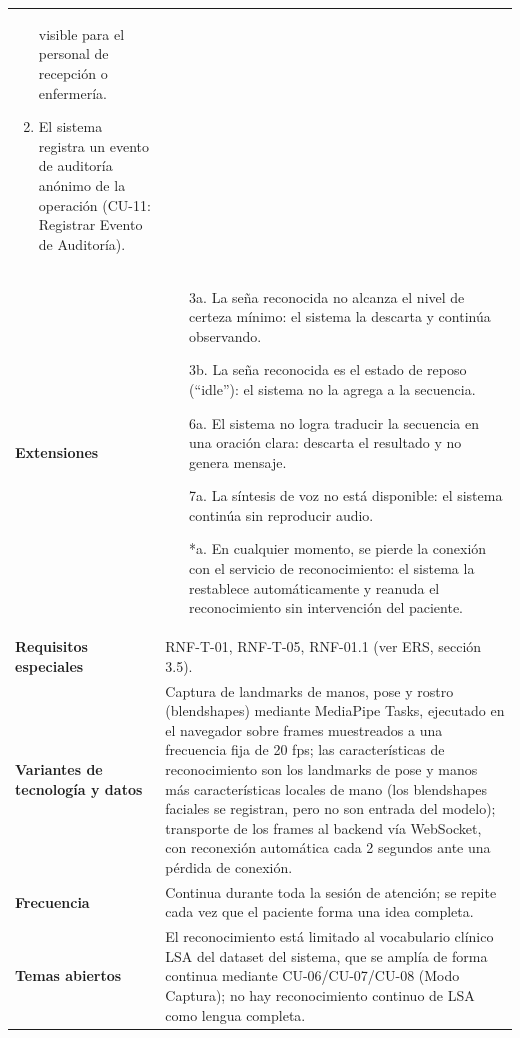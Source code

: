 \begin{longtable}{@{}>{\raggedright\arraybackslash}p{4.1cm} >{\raggedright\arraybackslash}p{\dimexpr\textwidth-4.1cm-2\tabcolsep\relax}@{}}
\begin{enumerate}[leftmargin=*, itemsep=2pt]
    visible para el personal de recepción o enfermería.
    \item El sistema registra un evento de auditoría anónimo de la
    operación (CU-11: Registrar Evento de Auditoría).
\end{enumerate} \\
\textbf{Extensiones} &
\begin{itemize}[leftmargin=*, itemsep=2pt]
    \item[3a.] La seña reconocida no alcanza el nivel de certeza mínimo: el
    sistema la descarta y continúa observando.
    \item[3b.] La seña reconocida es el estado de reposo (``idle''): el
    sistema no la agrega a la secuencia.
    \item[6a.] El sistema no logra traducir la secuencia en una oración
    clara: descarta el resultado y no genera mensaje.
    \item[7a.] La síntesis de voz no está disponible: el sistema continúa
    sin reproducir audio.
    \item[*a.] En cualquier momento, se pierde la conexión con el servicio
    de reconocimiento: el sistema la restablece automáticamente y reanuda
    el reconocimiento sin intervención del paciente.
\end{itemize} \\
\textbf{Requisitos especiales} & RNF-T-01, RNF-T-05, RNF-01.1 (ver ERS, sección 3.5). \\
\textbf{Variantes de tecnología y datos} &
Captura de landmarks de manos, pose y rostro (blendshapes) mediante
MediaPipe Tasks, ejecutado en el navegador sobre frames muestreados a una
frecuencia fija de 20 fps; las características de reconocimiento son los
landmarks de pose y manos más características locales de mano (los
blendshapes faciales se registran, pero no son entrada del modelo);
transporte de los frames
al backend vía WebSocket, con reconexión automática cada 2 segundos ante
una pérdida de conexión. \\
\textbf{Frecuencia} &
Continua durante toda la sesión de atención; se repite cada vez que el
paciente forma una idea completa. \\
\textbf{Temas abiertos} &
El reconocimiento está limitado al vocabulario clínico LSA del dataset del
sistema, que se amplía de forma continua mediante CU-06/CU-07/CU-08 (Modo
Captura); no hay reconocimiento continuo de LSA como lengua completa. \\
\bottomrule
\end{longtable}

